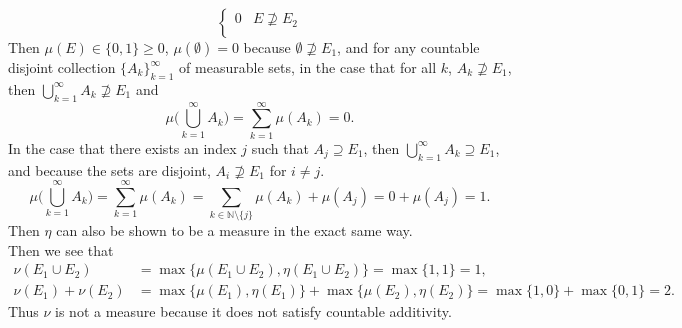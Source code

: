 \begin{enumerate}
\[\begin{cases}
			0&E\not\supseteq E_2\\
		\end{cases}
	\]
	Then $\mu(E)\in\{0,1\}\ge0$, $\mu(\emptyset)=0$ because $\emptyset\not\supseteq E_1$, and for any countable disjoint collection $\{A_k\}_{k=1}^\infty$ of measurable sets,
	in the case that for all $k$, $A_k\not\supseteq E_1$, then $\bigcup_{k=1}^\infty A_k\not\supseteq E_1$ and 
	\[
		\mu\biggl(\bigcup_{k=1}^\infty A_k\biggr)=\sum_{k=1}^\infty\mu(A_k)=0.
	\]
	In the case that there exists an index $j$ such that $A_j\supseteq E_1$, then $\bigcup_{k=1}^\infty A_k\supseteq E_1$, and because the sets are disjoint, $A_i\not\supseteq E_1$ for $i\neq j$.
	\[
		\mu\biggl(\bigcup_{k=1}^\infty A_k\biggr)=\sum_{k=1}^\infty\mu(A_k)=\sum_{k\in\mathbb{N}\setminus\{j\}}\mu(A_k)+\mu(A_j)=0+\mu(A_j)=1.
	\]
	Then $\eta$ can also be shown to be a measure in the exact same way.
	\\Then we see that
	\begin{align*}
		\nu(E_1\cup E_2)&=\max\{\mu(E_1\cup E_2),\eta(E_1\cup E_2)\}=\max\{1,1\}=1,\\
		\nu(E_1)+\nu(E_2)&=\max\{\mu(E_1),\eta(E_1)\}+\max\{\mu(E_2),\eta(E_2)\}=\max\{1,0\}+\max\{0,1\}=2.
	\end{align*}
	Thus $\nu$ is not a measure because it does not satisfy countable additivity.
\end{enumerate}

